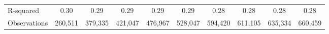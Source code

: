 {\begin{tabular}{l*{9}{c}}
                    &                     &                     &                     &                     &                     &                     &                     &                     &                     \\
\hline
R-squared           &        0.30         &        0.29         &        0.29         &        0.29         &        0.29         &        0.28         &        0.28         &        0.28         &        0.28         \\
Observations        &     260,511         &     379,335         &     421,047         &     476,967         &     528,047         &     594,420         &     611,105         &     635,334         &     660,459         \\
\hline\hline
\end{tabular}
}
